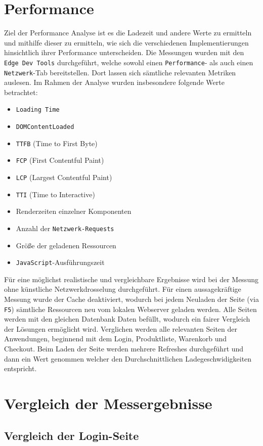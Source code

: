 \documentclass[oneside]{ausarbeitung}
\begin{document}
\section{Performance}
Ziel der Performance Analyse ist es die Ladezeit und andere Werte zu ermitteln und mithilfe dieser zu ermitteln, wie sich die verschiedenen Implementierungen hinsichtlich ihrer Performance unterscheiden.
Die Messungen wurden mit den \texttt{Edge Dev Tools} durchgeführt, welche sowohl einen \texttt{Performance}- als auch einen \texttt{Netzwerk}-Tab bereitstellen. Dort lassen sich sämtliche relevanten Metriken auslesen. Im Rahmen der Analyse wurden insbesondere folgende Werte betrachtet:
\begin{itemize}
  \item \texttt{Loading Time}
  \item \texttt{DOMContentLoaded}
  \item \texttt{TTFB} (Time to First Byte)
  \item \texttt{FCP} (First Contentful Paint)
  \item \texttt{LCP} (Largest Contentful Paint)
  \item \texttt{TTI} (Time to Interactive)
  \item Renderzeiten einzelner Komponenten
  \item Anzahl der \texttt{Netzwerk-Requests}
  \item Größe der geladenen Ressourcen
  \item \texttt{JavaScript}-Ausführungszeit
\end{itemize}

Für eine möglichst realistische und vergleichbare Ergebnisse wird bei der Messung ohne künstliche Netzwerkdrosselung durchgeführt. Für einen aussagekräftige Messung wurde der Cache deaktiviert, wodurch bei jedem Neuladen der Seite (via \texttt{F5}) sämtliche Ressourcen neu vom lokalen Webserver geladen werden. 
Alle Seiten werden mit den gleichen Datenbank Daten befüllt, wodurch ein fairer Vergleich der Lösungen ermöglicht wird. 
Verglichen werden alle relevanten Seiten der Anwendungen, beginnend mit dem Login, Produktliste, Warenkorb und Checkout.
Beim Laden der Seite werden mehrere Refreshes durchgeführt und dann ein Wert genommen welcher den Durchschnittlichen Ladegeschwidigkeiten entspricht.

\section{Vergleich der Messergebnisse}
\subsection{Vergleich der Login-Seite}
\end{document}
